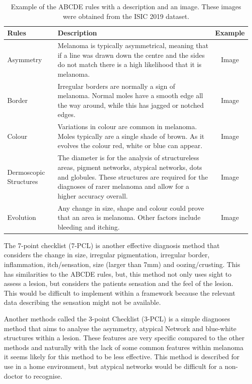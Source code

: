 \documentclass[12pt]{report}
\begin{document}
\begin{table}
\begin{tabular}{|p{2.1cm}|p{11.5cm}|c|}
	\hline
	Rules & Description & Example\\
	\hline
	Asymmetry & Melanoma is typically asymmetrical, meaning that if a line was drawn down the centre and the sides do not match there is a high likelihood that it is melanoma. & Image \\
	\hline
	Border & Irregular borders are normally a sign of melanoma. Normal moles have a smooth edge all the way around, while this has jagged or notched edges. & Image \\
	\hline
	Colour & Variations in colour are common in melanoma.  Moles typically are a single
	 shade of brown. As it evolves the colour red, white or blue can appear. & Image \\
	\hline	
	Dermoscopic Structures & The diameter is for the analysis of structureless areas, pigment networks, atypical networks, dots and globules. These structures are required for the diagnoses of rarer melanoma and allow for a higher accuracy overall.& Image \\
	\hline
	Evolution & Any change in size, shape and colour could prove that an area is melanoma. Other factors include bleeding and itching. & Image \\
	\hline
\end{tabular}
\caption{Example of the ABCDE rules with a description and an image. These images were obtained from the ISIC 2019 dataset\cite{Tschandl2018, Codella2018, Combalia2019}.}
\end{table} 

The 7-point checklist (7-PCL) is another effective\cite{Walter2013} diagnosis method that considers the change in size, irregular pigmentation, irregular border, inflammation, itch/sensation, size (larger than 7mm) and oozing/crusting. This has similarities to the ABCDE rules, but, this method not only uses sight to assess a lesion, but considers the patients sensation and the feel of the lesion. This would be difficult to implement within a framework because the relevant data describing the sensation might not be available.

Another methods called the 3-point Checklist (3-PCL) is a simple diagnoses method that aims to analyse the asymmetry, atypical Network and blue-white structures within a lesion. These features are very specific compared to the other methods and naturally with the lack of some common features within melanoma it seems likely for this method to be less effective. This method is described for use in a home environment, but atypical networks would be difficult for a non-doctor to recognise.
\end{document}
